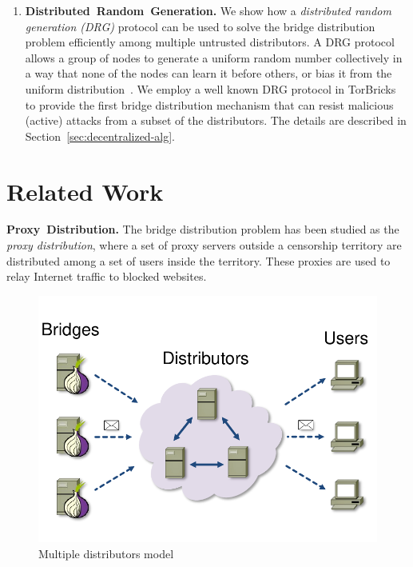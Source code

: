 \documentclass[letterpaper,twocolumn,10pt]{article}
\newcommand{\bricks}{}
\def\bricks/{\mbox{TorBricks}}
\newcommand{\sfsize}{\fontsize{0.68\baselineskip}{0.68\baselineskip}\selectfont}
\newcommand{\sans}[1]{\textbf{\textsf{\sfsize \mbox{#1}}}}
\newcommand{\para}[1]{\vspace{0.55em} \noindent \sans{{\mbox{#1}}}}
\begin{document}
\begin{enumerate}[leftmargin=1.7em, itemsep=0.7em, topsep=0.6em]
	
	\item \sans{Distributed Random Generation.} We show how a \emph{distributed random generation (DRG)} protocol can be used to solve the bridge distribution problem efficiently among multiple untrusted distributors. A DRG protocol allows a group of nodes to generate a uniform random number collectively in a way that none of the nodes can learn it before others, or bias it from the uniform distribution~\cite{cryptoeprint:2015:366,Tor:DRG:Proposal:2015}. We employ a well known DRG protocol in \bricks/ to provide the first bridge distribution mechanism that can resist malicious (active) attacks from a subset of the distributors. The details are described in Section~\ref{sec:decentralized-alg}.
\end{enumerate}

\section{Related Work} \label{sec:relatedwork}
\para{Proxy Distribution.} The bridge distribution problem has been studied as the \emph{proxy distribution}, where a set of proxy servers outside a censorship territory are distributed among a set of users inside the territory. These proxies are used to relay Internet traffic to blocked websites. 

\begin{figure}[t]
	\centering
	\includegraphics[width=0.4\linewidth]{images/multi-alg}
	\caption{Multiple distributors model}
	\label{fig:multidist}
\end{figure}
\end{document}
